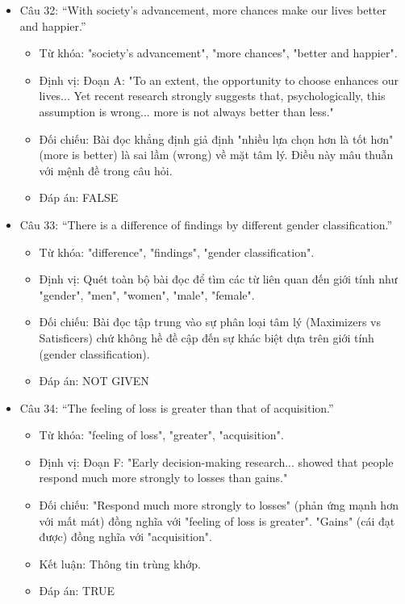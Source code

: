 \documentclass{../templateReading/cdreading}
\begin{document}
\begin{itemize}
\item Câu 32: “With society’s advancement, more chances make our lives better and happier.”
\begin{itemize}
\item Từ khóa: "society’s advancement", "more chances", "better and happier".
\item Định vị: Đoạn A: "To an extent, the opportunity to choose enhances our lives... Yet recent research strongly suggests that, psychologically, this assumption is wrong... more is not always better than less."
\item Đối chiếu: Bài đọc khẳng định giả định "nhiều lựa chọn hơn là tốt hơn" (more is better) là sai lầm (wrong) về mặt tâm lý. Điều này mâu thuẫn với mệnh đề trong câu hỏi.
\item Đáp án: FALSE
\end{itemize}
\item Câu 33: “There is a difference of findings by different gender classification.”
\begin{itemize}
\item Từ khóa: "difference", "findings", "gender classification".
\item Định vị: Quét toàn bộ bài đọc để tìm các từ liên quan đến giới tính như "gender", "men", "women", "male", "female".
\item Đối chiếu: Bài đọc tập trung vào sự phân loại tâm lý (Maximizers vs Satisficers) chứ không hề đề cập đến sự khác biệt dựa trên giới tính (gender classification).
\item Đáp án: NOT GIVEN
\end{itemize}
\item Câu 34: “The feeling of loss is greater than that of acquisition.”
\begin{itemize}
\item Từ khóa: "feeling of loss", "greater", "acquisition".
\item Định vị: Đoạn F: "Early decision-making research... showed that people respond much more strongly to losses than gains."
\item Đối chiếu: "Respond much more strongly to losses" (phản ứng mạnh hơn với mất mát) đồng nghĩa với "feeling of loss is greater". "Gains" (cái đạt được) đồng nghĩa với "acquisition".
\item Kết luận: Thông tin trùng khớp.
\item Đáp án: TRUE
\end{itemize}

\end{itemize}
\end{document}

